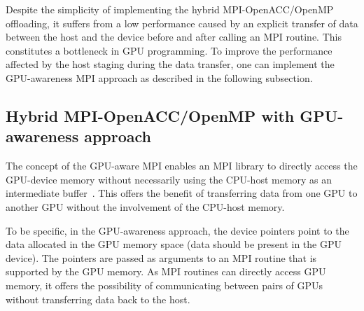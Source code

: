 





\par
Despite the simplicity of implementing the hybrid MPI-OpenACC/OpenMP offloading, it suffers from a low performance caused by an explicit transfer of data between the host and the device before and after calling an MPI routine.
This constitutes a bottleneck in GPU programming.
To improve the performance affected by the host staging during the data transfer, one can implement the GPU-awareness MPI approach as described in the following subsection.




\subsection{Hybrid MPI-OpenACC/OpenMP with GPU-awareness approach}


\par
The concept of the GPU-aware MPI enables an MPI library to directly access the GPU-device memory without necessarily using the CPU-host memory as an intermediate buffer~\cite{gpu_aware_mpi}.
This offers the benefit of transferring data from one GPU to another GPU without the involvement of the CPU-host memory.


\par
To be specific, in the GPU-awareness approach, the device pointers point to the data allocated in the GPU memory space (data should be present in the GPU device).
The pointers are passed as arguments to an MPI routine that is supported by the GPU memory.
As MPI routines can directly access GPU memory, it offers the possibility of communicating between pairs of GPUs without transferring data back to the host.


